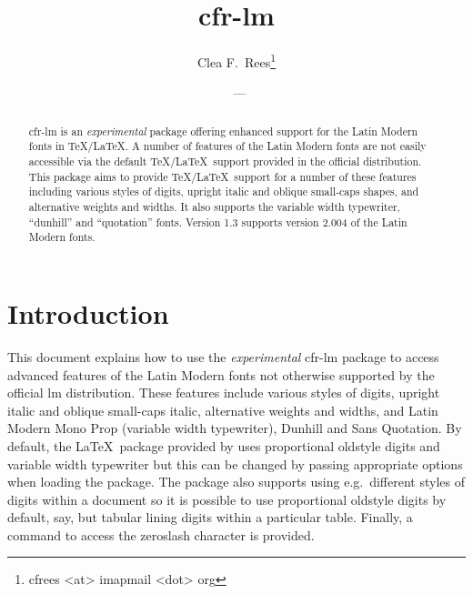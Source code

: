\documentclass[11pt,british]{article}
\title{cfr-lm}
\author{Clea F.\ Rees\footnote{cfrees <at> imapmail <dot> org}}
\date{\fyversion\ --- \dyddiad}
\begin{document}
\maketitle\thispagestyle{empty}
\setlength{\parindent}{0pt}
\setlength{\parskip}{0.5em}
	
\newcommand*{\lpack}[1]{\textsf{#1}}
\newcommand*{\fgroup}[1]{\textsf{#1}}

\begin{abstract}
	\hspace*{-\parindent}\lpack{cfr-lm} is an \emph{experimental} package offering enhanced support for the Latin Modern fonts in \TeX/\LaTeX. A number of features of the Latin Modern fonts are not easily accessible via the default \TeX/\LaTeX\ support provided in the official distribution. This package aims to provide \TeX/\LaTeX\ support for a number of these features including various styles of digits, upright italic and oblique small-caps shapes, and alternative weights and widths. It also supports the variable width typewriter, ``dunhill'' and ``quotation'' fonts. Version 1.3 supports version 2.004 of the Latin Modern fonts.
\end{abstract}

\tableofcontents


\section{Introduction}

This document explains how to use the \emph{experimental} \lpack{cfr-lm} package to access advanced features of the Latin Modern fonts not otherwise supported by the official \lpack{lm} distribution. These features include various styles of digits, upright italic and oblique small-caps italic, alternative weights and widths, and Latin Modern Mono Prop (variable width typewriter), Dunhill and Sans Quotation. By default, the \LaTeX\ package provided by  uses proportional oldstyle digits and variable width typewriter but this can be changed by passing appropriate options when loading the package. The package also supports using e.g.\ different styles of digits within a document so it is possible to use proportional oldstyle digits by default, say, but tabular lining digits within a particular table. Finally, a command to access the zeroslash character is provided.
\end{document}
